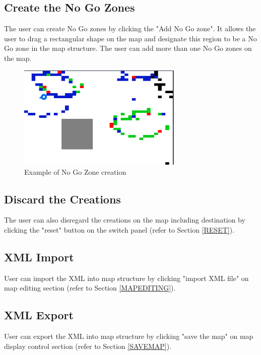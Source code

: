 \documentclass[12pt,a4paper]{article}
\begin{document}
\subsection{Create the No Go Zones} 
The user can create No Go zones by clicking the "Add No Go zone". It allows the user to drag a rectangular shape on the map and designate this region to be a No Go zone in the map structure. The user can add more than one No Go zones on the map.

\begin{figure}[!htb]
\centering
\includegraphics[width=0.7\textwidth]{ExampleOfNGZ.png}
\caption{Example of No Go Zone creation}
\end{figure}
\newpage
\subsection{Discard the Creations} 
The user can also disregard the creations on the map including destination by clicking the "reset" button on the switch panel (refer to Section \ref{RESET}).
\subsection{XML Import} 
User can import the XML into map structure by clicking "import XML file" on map editing section (refer to Section \ref{MAPEDITING}).
\subsection{XML Export} 
User can export the XML into map structure by clicking "save the map" on map display control section (refer to Section \ref{SAVEMAP}).

\printindex
\end{document}

